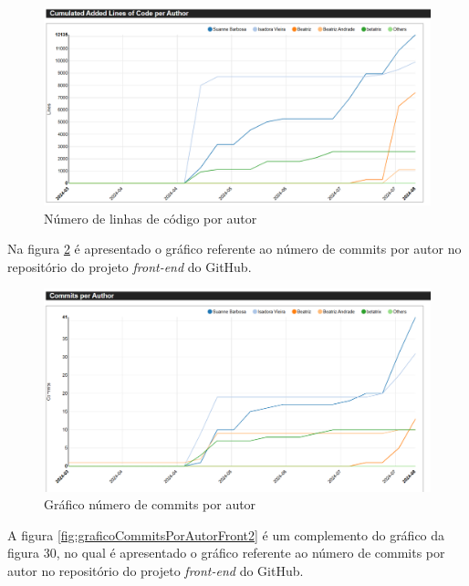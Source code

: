\begin{figure}[ht]
        \centering
\includegraphics[width=1.0\textwidth]{images/linhas-por-autor-stats-front.png}
        \caption{Número de linhas de código por autor}
        \label{fig:linhasPorAutorFront}
    \end{figure}


Na figura \ref{fig:graficoCommitsPorAutorFront} é apresentado o gráfico referente ao número de commits por autor no repositório do projeto \textit{front-end} do GitHub.  

\begin{figure}[ht]
        \centering
\includegraphics[width=1.0\textwidth]{images/commits-autor-stats-front.png}
        \caption{Gráfico número de commits por autor}
        \label{fig:graficoCommitsPorAutorFront}
    \end{figure}

\newpage

A figura \ref{fig:graficoCommitsPorAutorFront2} é um complemento do gráfico da figura 30, no qual é apresentado o gráfico referente ao número de commits por autor no repositório do projeto \textit{front-end} do GitHub.  

